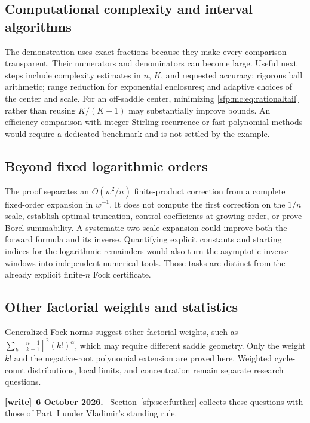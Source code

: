 \documentclass[11pt,letterpaper]{article}
\numberwithin{equation}{section}
\theoremstyle{definition}\newtheorem{definition}[theorem]{Definition}
\theoremstyle{remark}\newtheorem{remark}[theorem]{Remark}
\newcommand{\sone}[2]{\genfrac{[}{]}{0pt}{}{#1}{#2}}
\newcommand{\stir}{\sone}
\newenvironment{writenote}[1][]{\par\smallskip\begingroup\small
 \noindent\textbf{[write]}\if\relax\detokenize{#1}\relax\else~\textbf{#1.}\fi\ }%
 {\par\endgroup\smallskip}
\begin{document}
\subsection{Computational complexity and interval algorithms}\label{sfp:mc:sub:complexity}
The demonstration uses exact fractions because they make every
comparison transparent. Their numerators and denominators can
become large. Useful next steps include complexity estimates in
$n$, $K$, and requested accuracy; rigorous ball arithmetic;
range reduction for exponential enclosures; and adaptive choices
of the center and scale. For an off-saddle center, minimizing
\eqref{sfp:mc:eq:rationaltail} rather than reusing $K/(K+1)$ may
substantially improve bounds. An efficiency comparison with
integer Stirling recurrence or fast polynomial methods would
require a dedicated benchmark and is not settled by the example.

\subsection{Beyond fixed logarithmic orders}\label{sfp:mc:sub:beyond}
The proof separates an $O(w^2/n)$ finite-product correction from
a complete fixed-order expansion in $w^{-1}$. It does not compute
the first correction on the $1/n$ scale, establish optimal
truncation, control coefficients at growing order, or prove
Borel summability. A systematic two-scale expansion could improve
both the forward formula and its inverse. Quantifying explicit
constants and starting indices for the logarithmic remainders
would also turn the asymptotic inverse windows into independent
numerical tools. Those tasks are distinct from the already
explicit finite-$n$ Fock certificate.

\subsection{Other factorial weights and statistics}\label{sfp:mc:sub:weights}
Generalized Fock norms suggest other factorial weights, such as
$\sum_k\stir{n+1}{k+1}^{2}(k!)^\alpha$, which may require
different saddle geometry. Only the weight $k!$ and the
negative-root polynomial extension are proved here. Weighted
cycle-count distributions, local limits, and concentration
remain separate research questions.
\begin{writenote}[6 October 2026]
Section~\ref{sfp:sec:further} collects these questions with those of Part~I under Vladimir's standing rule.
\end{writenote}
\end{document}
